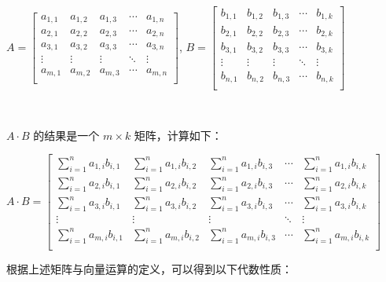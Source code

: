 \begin{tcolorbox}[title={\textbf{\tboxdef{\ref*{subsec:matrix-arithmetic}} 矩阵运算}}]
\begin{itemize}
$A = \begin{bmatrix}
 a_{1, 1} & a_{1, 2} & a_{1, 3} & \cdots & a_{1, n}\\
 a_{2, 1} & a_{2, 2} & a_{2, 3} & \cdots & a_{2, n} \\
 a_{3, 1} & a_{3, 2} & a_{3, 3} & \cdots & a_{3, n} \\
\vdots & \vdots & \vdots & \ddots & \vdots \\
 a_{m, 1} & a_{m, 2} & a_{m, 3} & \cdots & a_{m, n} \\
\end{bmatrix}$, $B = \begin{bmatrix}
 b_{1, 1} & b_{1, 2} & b_{1, 3} & \cdots & b_{1, k}\\
 b_{2, 1} & b_{2, 2} & b_{2, 3} & \cdots & b_{2, k} \\
 b_{3, 1} & b_{3, 2} & b_{3, 3} & \cdots & b_{3, k} \\
\vdots & \vdots & \vdots & \ddots & \vdots \\
 b_{n, 1} & b_{n, 2} & b_{n, 3} & \cdots & b_{n, k} \\
\end{bmatrix}$

$ $

$A \cdot B$ 的结果是一个 $m \times k$ 矩阵，计算如下：

$A \cdot B = \begin{bmatrix}
\sum\limits_{i=1}^{n}a_{1, i}b_{i, 1} & \sum\limits_{i=1}^{n}a_{1, i}b_{i, 2} & \sum\limits_{i=1}^{n}a_{1, i}b_{i, 3} & \cdots & \sum\limits_{i=1}^{n}a_{1, i}b_{i, k} \\
\sum\limits_{i=1}^{n}a_{2, i}b_{i, 1} & \sum\limits_{i=1}^{n}a_{2, i}b_{i, 2} & \sum\limits_{i=1}^{n}a_{2, i}b_{i, 3} & \cdots & \sum\limits_{i=1}^{n}a_{2, i}b_{i, k} \\
\sum\limits_{i=1}^{n}a_{3, i}b_{i, 1} & \sum\limits_{i=1}^{n}a_{3, i}b_{i, 2} & \sum\limits_{i=1}^{n}a_{3, i}b_{i, 3} & \cdots & \sum\limits_{i=1}^{n}a_{3, i}b_{i, k} \\
\vdots & \vdots & \vdots & \ddots & \vdots \\
\sum\limits_{i=1}^{n}a_{m, i}b_{i, 1}
& \sum\limits_{i=1}^{n}a_{m, i}b_{i, 2} & \sum\limits_{i=1}^{n}a_{m, i}b_{i, 3} & \cdots & \sum\limits_{i=1}^{n}a_{m, i}b_{i, k} \\
\end{bmatrix}$


\end{itemize}
\end{tcolorbox}

根据上述矩阵与向量运算的定义，可以得到以下代数性质：

